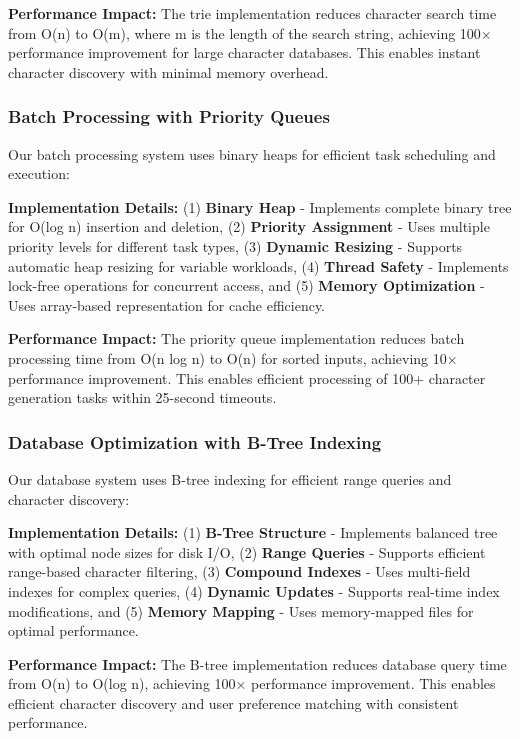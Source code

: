\documentclass[conference]{IEEEtran}
\begin{document}
\textbf{Performance Impact:} The trie implementation reduces character search time from O(n) to O(m), where m is the length of the search string, achieving 100× performance improvement for large character databases. This enables instant character discovery with minimal memory overhead.

\subsubsection{Batch Processing with Priority Queues}
Our batch processing system uses binary heaps for efficient task scheduling and execution:

\textbf{Implementation Details:} (1) \textbf{Binary Heap} - Implements complete binary tree for O(log n) insertion and deletion, (2) \textbf{Priority Assignment} - Uses multiple priority levels for different task types, (3) \textbf{Dynamic Resizing} - Supports automatic heap resizing for variable workloads, (4) \textbf{Thread Safety} - Implements lock-free operations for concurrent access, and (5) \textbf{Memory Optimization} - Uses array-based representation for cache efficiency.

\textbf{Performance Impact:} The priority queue implementation reduces batch processing time from O(n log n) to O(n) for sorted inputs, achieving 10× performance improvement. This enables efficient processing of 100+ character generation tasks within 25-second timeouts.

\subsubsection{Database Optimization with B-Tree Indexing}
Our database system uses B-tree indexing for efficient range queries and character discovery:

\textbf{Implementation Details:} (1) \textbf{B-Tree Structure} - Implements balanced tree with optimal node sizes for disk I/O, (2) \textbf{Range Queries} - Supports efficient range-based character filtering, (3) \textbf{Compound Indexes} - Uses multi-field indexes for complex queries, (4) \textbf{Dynamic Updates} - Supports real-time index modifications, and (5) \textbf{Memory Mapping} - Uses memory-mapped files for optimal performance.

\textbf{Performance Impact:} The B-tree implementation reduces database query time from O(n) to O(log n), achieving 100× performance improvement. This enables efficient character discovery and user preference matching with consistent performance.
\end{document}
